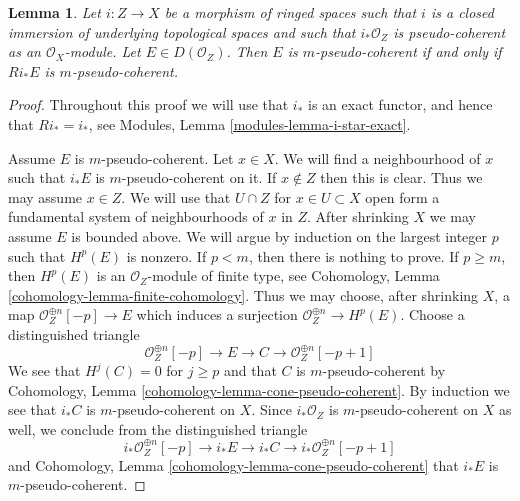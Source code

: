 \documentclass{stacks-project}
\theoremstyle{plain}
\newtheorem{lemma}[subsection]{Lemma}
\theoremstyle{definition}
\theoremstyle{remark}
\numberwithin{equation}{subsection}
\begin{document}
\begin{lemma}
\label{lemma-closed-push-pseudo-coherent}
Let $i : Z \to X$ be a morphism of ringed spaces such that
$i$ is a closed immersion of underlying topological spaces and such that
$i_*\mathcal{O}_Z$ is pseudo-coherent as an $\mathcal{O}_X$-module.
Let $E \in D(\mathcal{O}_Z)$. Then $E$ is $m$-pseudo-coherent
if and only if $Ri_*E$ is $m$-pseudo-coherent.
\end{lemma}

\begin{proof}
Throughout this proof we will use that $i_*$ is an exact functor, and
hence that $Ri_* = i_*$, see Modules, Lemma \ref{modules-lemma-i-star-exact}.

\medskip\noindent
Assume $E$ is $m$-pseudo-coherent. Let $x \in X$. We will find a neighbourhood
of $x$ such that $i_*E$ is $m$-pseudo-coherent on it. If $x \not \in Z$
then this is clear. Thus we may assume $x \in Z$. We will use
that $U \cap Z$ for $x \in U \subset X$ open form a fundamental system of
neighbourhoods of $x$ in $Z$. After shrinking $X$ we may assume $E$ is
bounded above. We will argue by induction on
the largest integer $p$ such that $H^p(E)$ is nonzero. If $p < m$, then
there is nothing to prove. If $p \geq m$, then $H^p(E)$ is an
$\mathcal{O}_Z$-module of finite type, see
Cohomology, Lemma \ref{cohomology-lemma-finite-cohomology}.
Thus we may choose, after shrinking $X$, a map
$\mathcal{O}_Z^{\oplus n}[-p] \to E$ which induces a surjection
$\mathcal{O}_Z^{\oplus n} \to H^p(E)$. Choose a distinguished triangle
$$
\mathcal{O}_Z^{\oplus n}[-p] \to E \to C \to \mathcal{O}_Z^{\oplus n}[-p + 1]
$$
We see that $H^j(C) = 0$ for $j \geq p$ and that $C$ is $m$-pseudo-coherent
by Cohomology, Lemma \ref{cohomology-lemma-cone-pseudo-coherent}.
By induction we see that $i_*C$ is $m$-pseudo-coherent on $X$.
Since $i_*\mathcal{O}_Z$ is $m$-pseudo-coherent on $X$ as well, we conclude
from the distinguished triangle
$$
i_*\mathcal{O}_Z^{\oplus n}[-p] \to i_*E \to i_*C \to
i_*\mathcal{O}_Z^{\oplus n}[-p + 1]
$$
and 
Cohomology, Lemma \ref{cohomology-lemma-cone-pseudo-coherent}
that $i_*E$ is $m$-pseudo-coherent.


\end{proof}
\end{document}
